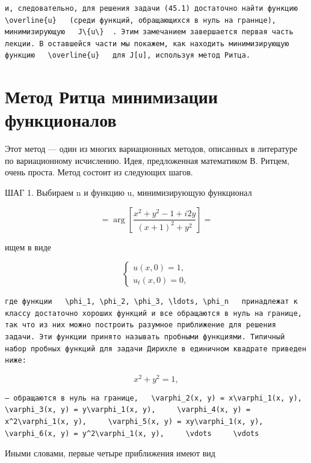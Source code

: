 \documentclass[
  ukrainian,
]{article}
\begin{document}
\begin{verbatim}
и, следовательно, для решения задачи (45.1) достаточно найти функцию   \overline{u}   (среди функций, обращающихся в нуль на граннце), минимизирующую   J\{u\}  . Этим замечанием завершается первая часть лекции. В оставшейся части мы покажем, как находить минимизирующую функцию   \overline{u}   для J[u], используя метод Ритца.
\end{verbatim}

\section{Метод Ритца минимизации
функционалов}\label{ux43cux435ux442ux43eux434-ux440ux438ux442ux446ux430-ux43cux438ux43dux438ux43cux438ux437ux430ux446ux438ux438-ux444ux443ux43dux43aux446ux438ux43eux43dux430ux43bux43eux432}

Этот метод --- один из многих вариационных методов, описанных в
литературе по вариационному исчислению. Идея, предложенная математиком
В. Ритцем, очень проста. Метод состоит из следующих шагов.

ШАГ 1. Выбираем n и функцию u, минимизирующую функционал

\[
= \arg\left[\frac{x^2+y^2-1+i2y}{(x+1)^2+y^2}\right] =
\]

ищем в виде

\[
\begin{cases} u(x, 0) = 1, \\ u_t(x, 0) = 0, \end{cases}
\]

\begin{verbatim}
где функции   \phi_1, \phi_2, \phi_3, \ldots, \phi_n   принадлежат к классу достаточно хороших функций и все обращаются в нуль на границе, так что из них можно построить разумное приближение для решения задачи. Эти функции принято называть пробными функциями. Типичный набор пробных функций для задачи Дирихле в единичном квадрате приведен ниже:
\end{verbatim}

\[
x^{2} + y^{2} = 1,
\]

\begin{verbatim}
— обращаются в нуль на границе,   \varphi_2(x, y) = x\varphi_1(x, y),     \varphi_3(x, y) = y\varphi_1(x, y),     \varphi_4(x, y) = x^2\varphi_1(x, y),     \varphi_5(x, y) = xy\varphi_1(x, y),     \varphi_6(x, y) = y^2\varphi_1(x, y),     \vdots     \vdots
\end{verbatim}

Иными словами, первые четыре приближения имеют вид
\end{document}
